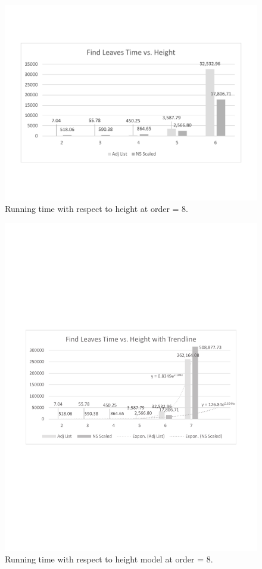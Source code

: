 \begin{figure}[!h]
\begin{center}
\includegraphics[width=6in]{images/eval/leaves/height/col.pdf}
\caption{Running time with respect to height at order = 8.\label{fig-leaves-height1}}
\end{center}
\end{figure}

\begin{figure}[!h]
\begin{center}
\includegraphics[width=6in]{images/eval/leaves/height/col_trend.pdf}
\caption{Running time with respect to height model at order = 8.\label{fig-leaves-height2}}
\end{center}
\end{figure}

